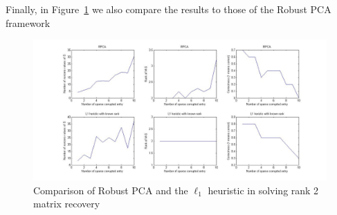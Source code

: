 Finally, in Figure~\ref{fig:rank2s} we also compare the results to those of the Robust PCA framework
%
\begin{figure}[h!]
\centering
\includegraphics[width=\textwidth]{../figures/comparisonwithrank2.jpg}
\caption{Comparison of Robust PCA and the $\ell_1$ heuristic in solving rank 2 matrix recovery}
\label{fig:rank2s}
\end{figure}


